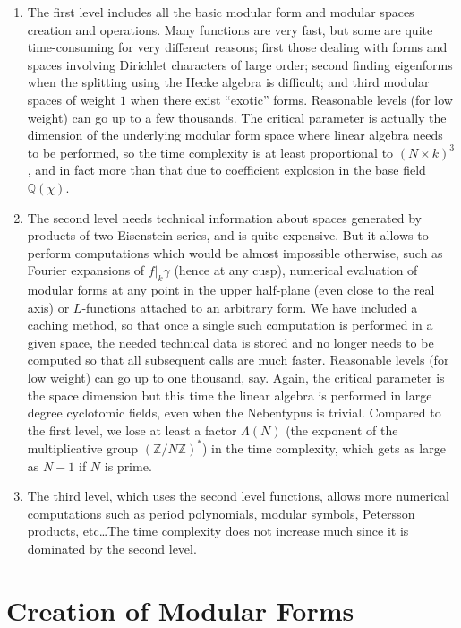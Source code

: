\documentclass[11pt]{article}
\newcommand{\Q}{{\mathbb Q}}
\newcommand{\Z}{{\mathbb Z}}
\begin{document}
\begin{enumerate}
\item The first level includes all the basic modular form and modular spaces
creation and operations. Many functions are very fast, but some are quite
time-consuming for very different reasons; first those dealing with forms and
spaces involving Dirichlet characters of large order; second finding eigenforms
when the splitting using the Hecke algebra is difficult; and third modular
spaces of weight $1$ when there exist ``exotic'' forms. Reasonable levels
(for low weight) can go up to a few thousands. The critical parameter is
actually the dimension of the underlying modular form space where linear
algebra needs to be performed, so the time complexity is at least
proportional to $(N\times k)^3$, and in fact more than that due to
coefficient explosion in the base field $\Q(\chi)$.

\item The second level needs technical information about spaces generated by
products of two Eisenstein series, and is quite expensive. But it allows to
perform computations which would be almost impossible otherwise, such as
Fourier expansions of $f|_k\gamma$ (hence at any cusp), numerical
evaluation of modular forms at any point in the upper half-plane (even close
to the real axis) or $L$-functions attached to an arbitrary form. We have
included a caching method, so that once a single such computation is
performed in a given space, the needed technical data is stored and
no longer needs to be computed so that all subsequent calls are much faster.
Reasonable levels (for low weight) can go up to one thousand, say.
Again, the critical parameter is the space dimension but this time the
linear algebra is performed in large degree cyclotomic fields, even when the
Nebentypus is trivial. Compared to the first level, we lose at least
a factor $\Lambda(N)$ (the exponent of the multiplicative group $(\Z/N\Z)^*$)
in the time complexity, which gets as large as $N-1$ if $N$ is prime.

\item The third level, which uses the second level functions, allows more
numerical computations such as period polynomials, modular symbols,
Petersson products, etc\dots The time complexity does not increase much
since it is dominated by the second level.
\end{enumerate}

\section{Creation of Modular Forms}
\end{document}
